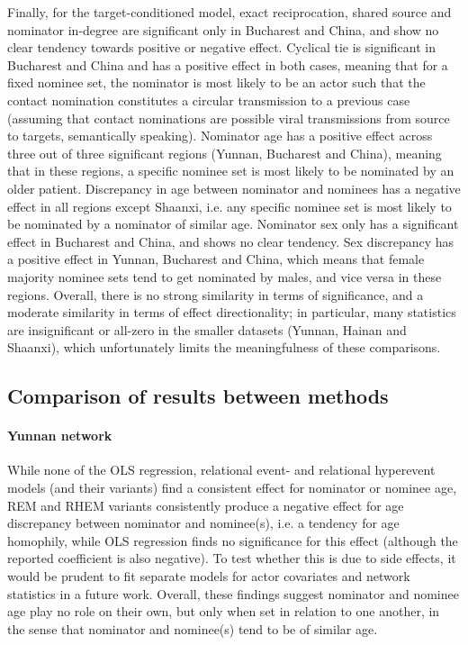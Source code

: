 Finally, for the target-conditioned model, exact reciprocation, shared source and nominator in-degree are significant only in Bucharest and China, and show no clear tendency towards positive or negative effect. Cyclical tie is significant in Bucharest and China and has a positive effect in both cases, meaning that for a fixed nominee set, the nominator is most likely to be an actor such that the contact nomination constitutes a circular transmission to a previous case (assuming that contact nominations are possible viral transmissions from source to targets, semantically speaking). Nominator age has a positive effect across three out of three significant regions (Yunnan, Bucharest and China), meaning that in these regions, a specific nominee set is most likely to be nominated by an older patient. Discrepancy in age between nominator and nominees has a negative effect in all regions except Shaanxi, i.e. any specific nominee set is most likely to be nominated by a nominator of similar age. Nominator sex only has a significant effect in Bucharest and China, and shows no clear tendency. Sex discrepancy has a positive effect in Yunnan, Bucharest and China, which means that female majority nominee sets tend to get nominated by males, and vice versa in these regions. Overall, there is no strong similarity in terms of significance, and a moderate similarity in terms of effect directionality; in particular, many statistics are insignificant or all-zero in the smaller datasets (Yunnan, Hainan and Shaanxi), which unfortunately limits the meaningfulness of these comparisons.

\subsection{Comparison of results between methods}
\label{sec:discussion_methods}

\paragraph{Yunnan network} While none of the OLS regression, relational event- and relational hyperevent models (and their variants) find a consistent effect for nominator or nominee age, REM and RHEM variants consistently produce a negative effect for age discrepancy between nominator and nominee(s), i.e. a tendency for age homophily, while OLS regression finds no significance for this effect (although the reported coefficient is also negative). To test whether this is due to side effects, it would be prudent to fit separate models for actor covariates and network statistics in a future work. Overall, these findings suggest nominator and nominee age play no role on their own, but only when set in relation to one another, in the sense that nominator and nominee(s) tend to be of similar age.

